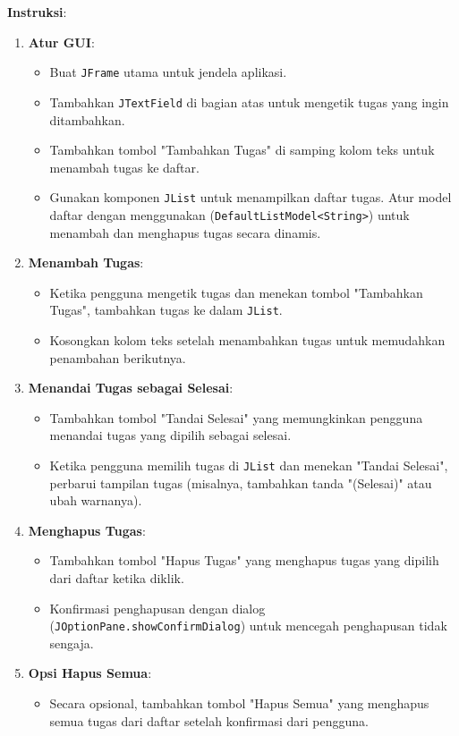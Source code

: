 \textbf{Instruksi}:
\begin{enumerate}
	\item \textbf{Atur GUI}:
	\begin{itemize}
		\item Buat \texttt{JFrame} utama untuk jendela aplikasi.
		\item Tambahkan \texttt{JTextField} di bagian atas untuk mengetik tugas yang ingin ditambahkan.
		\item Tambahkan tombol "Tambahkan Tugas" di samping kolom teks untuk menambah tugas ke daftar.
		\item Gunakan komponen \texttt{JList} untuk menampilkan daftar tugas. Atur model daftar dengan menggunakan (\texttt{DefaultListModel<String>}) untuk menambah dan menghapus tugas secara dinamis.
	\end{itemize}
	
	\item \textbf{Menambah Tugas}:
	\begin{itemize}
		\item Ketika pengguna mengetik tugas dan menekan tombol "Tambahkan Tugas", tambahkan tugas ke dalam \texttt{JList}.
		\item Kosongkan kolom teks setelah menambahkan tugas untuk memudahkan penambahan berikutnya.
	\end{itemize}
	
	\item \textbf{Menandai Tugas sebagai Selesai}:
	\begin{itemize}
		\item Tambahkan tombol "Tandai Selesai" yang memungkinkan pengguna menandai tugas yang dipilih sebagai selesai.
		\item Ketika pengguna memilih tugas di \texttt{JList} dan menekan "Tandai Selesai", perbarui tampilan tugas (misalnya, tambahkan tanda "(Selesai)" atau ubah warnanya).
	\end{itemize}
	
	\item \textbf{Menghapus Tugas}:
	\begin{itemize}
		\item Tambahkan tombol "Hapus Tugas" yang menghapus tugas yang dipilih dari daftar ketika diklik.
		\item Konfirmasi penghapusan dengan dialog (\texttt{JOptionPane.showConfirmDialog}) untuk mencegah penghapusan tidak sengaja.
	\end{itemize}
	
	\item \textbf{Opsi Hapus Semua}:
	\begin{itemize}
		\item Secara opsional, tambahkan tombol "Hapus Semua" yang menghapus semua tugas dari daftar setelah konfirmasi dari pengguna.
	\end{itemize}
	

\end{enumerate}
